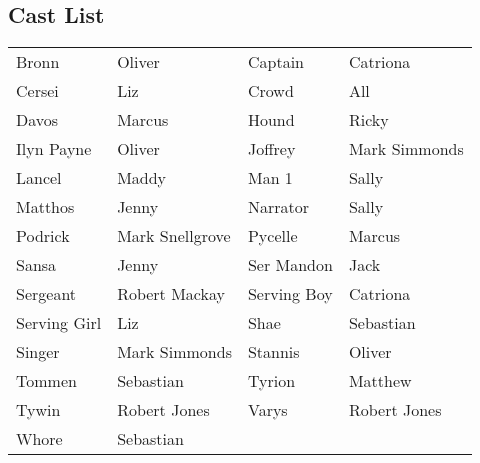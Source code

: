 \subsection*{Cast List}
\begin{tabular}{ll|ll}\\
Bronn & Oliver &  Captain & Catriona\\
Cersei & Liz &  Crowd & All\\
Davos & Marcus &  Hound & Ricky\\
Ilyn Payne & Oliver &  Joffrey & Mark Simmonds\\
Lancel & Maddy &  Man 1 & Sally\\
Matthos & Jenny &  Narrator & Sally\\
Podrick & Mark Snellgrove &  Pycelle & Marcus\\
Sansa & Jenny &  Ser Mandon & Jack\\
Sergeant & Robert Mackay &  Serving Boy & Catriona\\
Serving Girl & Liz &  Shae & Sebastian\\
Singer & Mark Simmonds &  Stannis & Oliver\\
Tommen & Sebastian &  Tyrion & Matthew\\
Tywin & Robert Jones &  Varys & Robert Jones\\
Whore & Sebastian &  \end{tabular}
